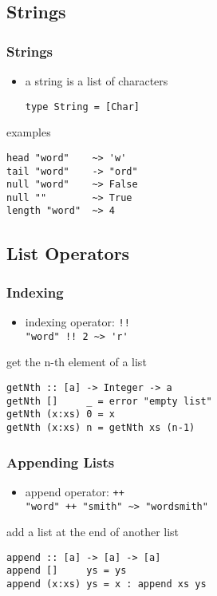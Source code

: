 \documentclass[dvipsnames]{beamer}
\theoremstyle{plain}
\begin{document}
\subsection{Strings}

\begin{frame}[fragile]
  \frametitle{Strings}

  \begin{itemize}
    \item a string is a list of characters
    \begin{lstlisting}
type String = [Char]
    \end{lstlisting}
  \end{itemize}

  \pause
  \begin{exampleblock}{examples}
    \begin{lstlisting}
head "word"    ~> 'w'
tail "word"    -> "ord"
null "word"    ~> False
null ""        ~> True
length "word"  ~> 4
    \end{lstlisting}
  \end{exampleblock}
\end{frame}

\subsection{List Operators}

\begin{frame}[fragile]
  \frametitle{Indexing}

  \begin{itemize}
    \item indexing operator: \lstinline{!!}\\
      \lstinline{"word" !! 2 ~> 'r'}
  \end{itemize}

  \begin{exampleblock}{get the n-th element of a list}
    \begin{lstlisting}
getNth :: [a] -> Integer -> a
getNth []     _ = error "empty list"
getNth (x:xs) 0 = x
getNth (x:xs) n = getNth xs (n-1)
    \end{lstlisting}
  \end{exampleblock}
\end{frame}

\begin{frame}[fragile]
  \frametitle{Appending Lists}

  \begin{itemize}
    \item append operator: \lstinline{++}\\
      \lstinline{"word" ++ "smith" ~> "wordsmith"}
  \end{itemize}

  \begin{exampleblock}{add a list at the end of another list}
    \begin{lstlisting}
append :: [a] -> [a] -> [a]
append []     ys = ys
append (x:xs) ys = x : append xs ys
    \end{lstlisting}
  \end{exampleblock}
\end{frame}
\end{document}
